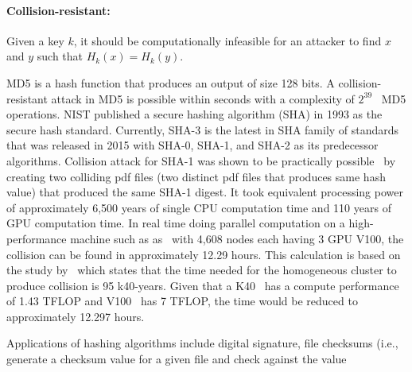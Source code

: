 \paragraph{Collision-resistant:} Given a key $k$, it should be computationally
infeasible for an attacker to find $x$ and $y$ such that $H_k(x) = H_k(y)$.
\par   
MD5 is a hash function that produces an output of size 128 bits. A
collision-resistant attack in MD5 is possible within seconds with a complexity
of $2^{39}$~\cite{wang2005break} MD5 operations. NIST published a secure
hashing algorithm (SHA) in 1993 as the secure hash standard. Currently, SHA-3
is the latest in SHA family of standards that was released in 2015 with SHA-0,
SHA-1, and SHA-2 as its predecessor algorithms. Collision attack for SHA-1 was
shown to be practically possible~\cite{stevens2017first} by creating two
colliding pdf files (two distinct pdf files that produces same hash value) that
produced the same SHA-1 digest. It took equivalent processing power of
approximately 6,500 years of single CPU computation time and 110 years of GPU
computation time. In real time doing parallel computation on a high-performance
machine such as as~\cite{oakridge,top500} with 4,608 nodes each having 3 GPU
V100, the collision can be found in approximately 12.29 hours. This calculation
is based on the study by~\cite{stevens2017first} which states that the time
needed for the homogeneous cluster to produce collision is 95 k40-years. Given
that a K40~\cite{k40} has a compute performance of 1.43 TFLOP and
V100~\cite{v100} has 7 TFLOP, the time would be reduced to approximately 12.297
hours.\par
Applications of hashing algorithms include digital signature, file checksums
(i.e., generate a checksum value for a given file and check against the value
